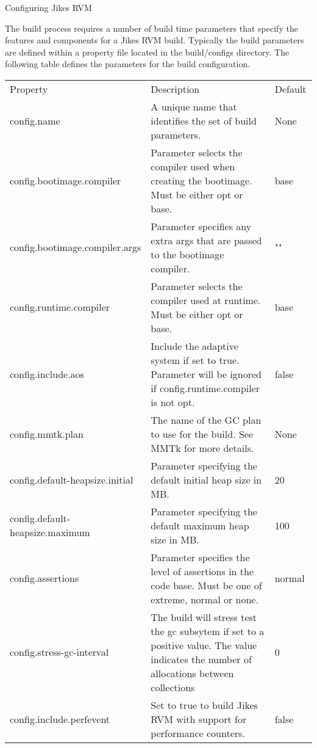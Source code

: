 \begin{chapter}{Configuring Jikes RVM}
\label{cha:configuringjikesrvm}

The build process requires a number of build time parameters that specify the features and components for a Jikes RVM build. Typically the build parameters are defined within a property file located in the build/configs directory. The following table defines the parameters for the build configuration.

\begin{table}
\centering
\begin{tabular}{p{0.25\linewidth}p{0.6\linewidth}p{0.15\linewidth}}
Property & Description & Default \\
config.name & A unique name that identifies the set of build parameters. & None \\
config.bootimage.\newline compiler & Parameter selects the compiler used when creating the bootimage. Must be either opt or base. & base \\
config.bootimage.\newline compiler.args & Parameter specifies any extra args that are passed to the bootimage compiler. & "" \\
config.runtime.\newline compiler & Parameter selects the compiler used at runtime. Must be either opt or base. & base \\
config.include.\newline aos & Include the adaptive system if set to true. Parameter will be ignored if config.runtime.compiler is not opt. & false \\
config.mmtk.plan & The name of the GC plan to use for the build. See MMTk for more details. & None \\
config.default-heapsize.initial & Parameter specifying the default initial heap size in MB. & 20 \\
config.default-heapsize.maximum & Parameter specifying the default maximum heap size in MB. & 100 \\
config.assertions & Parameter specifies the level of assertions in the code base. Must be one of extreme, normal or none. & normal \\
config.stress-gc-interval & The build will stress test the gc subsytem if set to a positive value. The value indicates the number of allocations between collections & 0 \\
config.include.\newline perfevent & Set to true to build Jikes RVM with support for performance counters. & false \\

\end{tabular}
\end{table}
\end{chapter}
